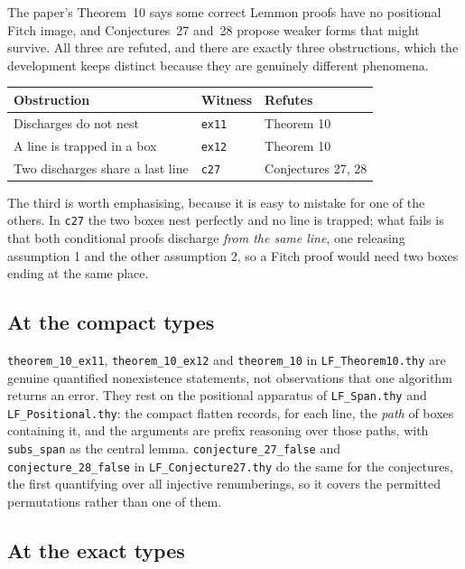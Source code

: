 \documentclass[11pt]{article}
\theoremstyle{plain}
\newcommand{\ubrk}{\_\discretionary{}{}{}}
\newcommand{\isa}[1]{\textup{\texttt{\small #1}}}
\newcommand{\thy}[1]{\textup{\texttt{\small #1}}}
\begin{document}
The paper's Theorem~10 says some correct Lemmon proofs have no positional Fitch
image, and Conjectures~27 and~28 propose weaker forms that might survive. All
three are refuted, and there are exactly three obstructions, which the
development keeps distinct because they are genuinely different phenomena.

\begin{center}
\begin{tabular}{@{}lll@{}}
\toprule
Obstruction & Witness & Refutes \\
\midrule
Discharges do not nest    & \isa{ex11} & Theorem 10 \\
A line is trapped in a box & \isa{ex12} & Theorem 10 \\
Two discharges share a last line & \isa{c27} & Conjectures 27, 28 \\
\bottomrule
\end{tabular}
\end{center}

\noindent
The third is worth emphasising, because it is easy to mistake for one of the
others. In \isa{c27} the two boxes nest perfectly and no line is trapped; what
fails is that both conditional proofs discharge \emph{from the same line}, one
releasing assumption 1 and the other assumption 2, so a Fitch proof would need
two boxes ending at the same place.

\subsection{At the compact types}

\isa{theorem\ubrk{}10\ubrk{}ex11}, \isa{theorem\ubrk{}10\ubrk{}ex12} and \isa{theorem\ubrk{}10} in
\thy{LF\ubrk{}Theorem10.thy} are genuine quantified nonexistence statements, not
observations that one algorithm returns an error. They rest on the positional
apparatus of \thy{LF\ubrk{}Span.thy} and \thy{LF\ubrk{}Positional.thy}: the compact
flatten records, for each line, the \emph{path} of boxes containing it, and the
arguments are prefix reasoning over those paths, with \isa{subs\ubrk{}span} as the
central lemma. \isa{conjecture\ubrk{}27\ubrk{}false} and \isa{conjecture\ubrk{}28\ubrk{}false} in
\thy{LF\ubrk{}Conjecture27.thy} do the same for the conjectures, the first
quantifying over all injective renumberings, so it covers the permitted
permutations rather than one of them.

\subsection{At the exact types}\label{sec:bridge}
\end{document}

